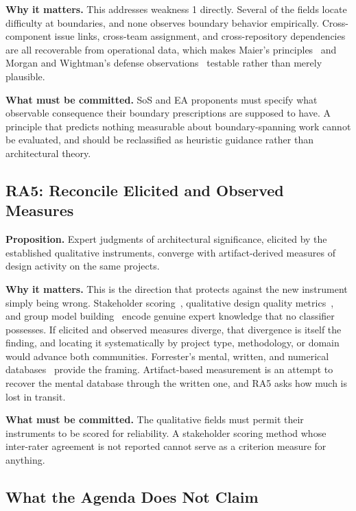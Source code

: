 \documentclass{csimq}
\begin{document}
\textbf{Why it matters.} This addresses weakness 1 directly. Several of the fields
locate difficulty at boundaries, and none observes boundary behavior
empirically. Cross-component issue links, cross-team assignment, and
cross-repository dependencies are all recoverable from operational data, which
makes Maier's principles~\cite{maier1998} and Morgan and Wightman's defense
observations~\cite{morgan2023} testable rather than merely plausible.

\textbf{What must be committed.} SoS and EA proponents must specify what
observable consequence their boundary prescriptions are supposed to have. A
principle that predicts nothing measurable about boundary-spanning work cannot
be evaluated, and should be reclassified as heuristic guidance rather than
architectural theory.

\subsection{RA5: Reconcile Elicited and Observed Measures}

\textbf{Proposition.} Expert judgments of architectural significance, elicited by
the established qualitative instruments, converge with artifact-derived measures
of design activity on the same projects.

\textbf{Why it matters.} This is the direction that protects against the new
instrument simply being wrong. Stakeholder scoring~\cite{moore2003},
qualitative design quality metrics~\cite{nord2014}, and group model
building~\cite{hovmand2013} encode genuine expert knowledge that no classifier
possesses. If elicited and observed measures diverge, that divergence is itself
the finding, and locating it systematically by project type, methodology, or
domain would advance both communities. Forrester's mental, written, and
numerical databases~\cite{forrester2009} provide the framing. Artifact-based
measurement is an attempt to recover the mental database through the written
one, and RA5 asks how much is lost in transit.

\textbf{What must be committed.} The qualitative fields must permit their
instruments to be scored for reliability. A stakeholder scoring method whose
inter-rater agreement is not reported cannot serve as a criterion measure for
anything.

\subsection{What the Agenda Does Not Claim}
\end{document}
